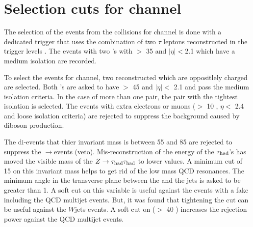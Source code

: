 \section{\texorpdfstring{Selection cuts for \Tau\Tau channel}{Selection cuts for tau-tau channel}}
\label{sect:tauTauCuts}
The selection of the events from the collisions for \Tau\Tau channel
is done with a dedicated trigger that uses the combination of 
two $\tau$ leptons reconstructed in the trigger levels \cite{CMS:2013hoa,Chatrchyan:2012xi,Chatrchyan:2011nv}.
The events with two \Tau's with \PT $>$ 35 \GeV and $|\eta|<$2.1 which have a medium isolation are recorded. 

To select the events for \Tau\Tau channel, two reconstructed \Tau which are oppositlely charged are selected. Both \Tau's are asked to 
have \PT $>$ 45 \GeV and $|\eta| <$ 2.1 and pass the medium isolation criteria.
In the case of more than one pair, the pair with the tightest isolation 
is selected.
The events with extra electrons or muons (\PT $>$ 10 \GeV, $\eta <$ 2.4 and loose isolation criteria) 
are rejected to suppress %
the background caused by diboson production.

The di-\Tau events that thier invariant mass is between 55 and 85 \GeV are rejected to suppress the \Z$\rightarrow$\Tau\Tau events (\Z veto).
Mis-reconstruction of the energy of the $\tau_{\rm had}$'s has moved the visible mass of the $Z\to\tau_{\rm had}\tau_{\rm had}$ to lower values.
A minimum cut of 15 \GeV on this invariant mass helps to get rid of the low mass
QCD resonances. The minimum angle in the transverse plane between the \MET and the jets %
is asked to be greater than 1. A soft cut on this variable is useful against the events with a fake \MET including the QCD multijet events. 
But, it was found that tightening the cut can be useful against the $W$jets events.
A soft cut on \mttwo ($>$ 40 \GeV) increases the rejection power against the QCD multijet events.

